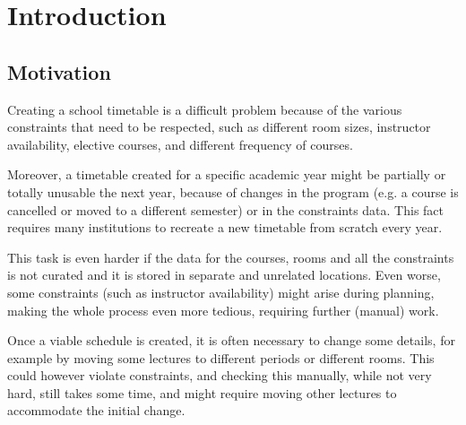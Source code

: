 \documentclass[12pt, a4paper, english]{report}
\begin{document}
\chapter{Introduction}
\section{Motivation}
Creating a school timetable is a difficult problem because of the various constraints that need to be respected, such as different room sizes, instructor availability, elective courses, and different frequency of courses.\par
Moreover, a timetable created for a specific academic year might be partially or totally unusable the next year, because of changes in the program (e.g. a course is cancelled or moved to a different semester) or in the constraints data. This fact requires many institutions to recreate a new timetable from scratch every year.\par
This task is even harder if the data for the courses, rooms and all the constraints is not curated and it is stored in separate and unrelated locations. Even worse, some constraints (such as instructor availability) might arise during planning, making the whole process even more tedious, requiring further (manual) work.\par
Once a viable schedule is created, it is often necessary to change some details, for example by moving some lectures to different periods or different rooms. This could however violate constraints, and checking this manually, while not very hard, still takes some time, and might require moving other lectures to accommodate the initial change.

\end{document}
